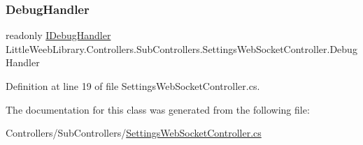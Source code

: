 \subsubsection{\texorpdfstring{Debug\+Handler}{DebugHandler}}
{\footnotesize\ttfamily readonly \mbox{\hyperlink{interface_little_weeb_library_1_1_handlers_1_1_i_debug_handler}{I\+Debug\+Handler}} Little\+Weeb\+Library.\+Controllers.\+Sub\+Controllers.\+Settings\+Web\+Socket\+Controller.\+Debug\+Handler\hspace{0.3cm}{\ttfamily [private]}}



Definition at line 19 of file Settings\+Web\+Socket\+Controller.\+cs.



The documentation for this class was generated from the following file\+:\begin{DoxyCompactItemize}
\item 
Controllers/\+Sub\+Controllers/\mbox{\hyperlink{_settings_web_socket_controller_8cs}{Settings\+Web\+Socket\+Controller.\+cs}}\end{DoxyCompactItemize}
